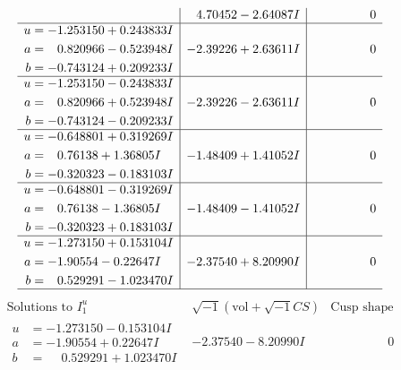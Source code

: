 \documentclass[1p]{elsarticle_modified}
\theoremstyle{definition}
\newcommand{\I}{\sqrt{-1}}
\begin{document}
$$\begin{array}{c|c|c}
 & \phantom{-}4.70452 - 2.64087 I & \phantom{-0.000000 } 0 \\ \hline\begin{aligned}
u &= -1.253150 + 0.243833 I \\
a &= \phantom{-}0.820966 - 0.523948 I \\
b &= -0.743124 + 0.209233 I\end{aligned}
 & -2.39226 + 2.63611 I & \phantom{-0.000000 } 0 \\ \hline\begin{aligned}
u &= -1.253150 - 0.243833 I \\
a &= \phantom{-}0.820966 + 0.523948 I \\
b &= -0.743124 - 0.209233 I\end{aligned}
 & -2.39226 - 2.63611 I & \phantom{-0.000000 } 0 \\ \hline\begin{aligned}
u &= -0.648801 + 0.319269 I \\
a &= \phantom{-}0.76138 + 1.36805 I \\
b &= -0.320323 - 0.183103 I\end{aligned}
 & -1.48409 + 1.41052 I & \phantom{-0.000000 } 0 \\ \hline\begin{aligned}
u &= -0.648801 - 0.319269 I \\
a &= \phantom{-}0.76138 - 1.36805 I \\
b &= -0.320323 + 0.183103 I\end{aligned}
 & -1.48409 - 1.41052 I & \phantom{-0.000000 } 0 \\ \hline\begin{aligned}
u &= -1.273150 + 0.153104 I \\
a &= -1.90554 - 0.22647 I \\
b &= \phantom{-}0.529291 - 1.023470 I\end{aligned}
 & -2.37540 + 8.20990 I & \phantom{-0.000000 } 0\\
 \hline 
 \end{array}$$\newpage$$\begin{array}{c|c|c}  
\text{Solutions to }I^u_{1}& \I (\text{vol} + \sqrt{-1}CS) & \text{Cusp shape}\\
 \hline 
\begin{aligned}
u &= -1.273150 - 0.153104 I \\
a &= -1.90554 + 0.22647 I \\
b &= \phantom{-}0.529291 + 1.023470 I\end{aligned}
 & -2.37540 - 8.20990 I & \phantom{-0.000000 } 0 \\ \hline\begin{aligned}

\end{aligned}
\end{array}$$
\end{document}
